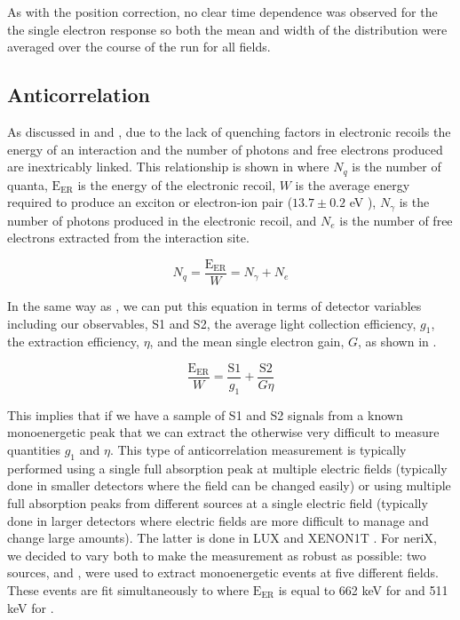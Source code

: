 As with the position correction, no clear time dependence was observed for the the single electron response so both the mean and width of the distribution were averaged over the course of the run for all fields.



\subsection{Anticorrelation}
\label{sec:nerix_anticorrelation}

As discussed in  and , due to the lack of quenching factors in electronic recoils the energy of an interaction and the number of photons and free electrons produced are inextricably linked.  This relationship is shown in  where $N_q$ is the number of quanta, $\textrm{E}_{\textrm{ER}}$ is the energy of the electronic recoil, $W$ is the average energy required to produce an exciton or electron-ion pair ($13.7 \pm 0.2$ eV \cite{dahl_thesis}), $N_{\gamma}$ is the number of photons produced in the electronic recoil, and $N_e$ is the number of free electrons extracted from the interaction site.

\begin{equation}
        \label{eqn:nerix_anticorrelation}
        N_q = \frac{\textrm{E}_{\textrm{ER}}}{W} = N_{\gamma} + N_{e}
\end{equation} 

In the same way as , we can put this equation in terms of detector variables including our observables, S1 and S2, the average light collection efficiency, $g_1$, the extraction efficiency, $\eta$, and the mean single electron gain, $G$, as shown in .

\begin{equation}
        \label{eqn:nerix_anticorrelation_s1_s2}
        \frac{\textrm{E}_{\textrm{ER}}}{W} = \frac{\textrm{S1}}{g_1} + \frac{\textrm{S2}}{G \eta}
\end{equation}

This implies that if we have a sample of S1 and S2 signals from a known monoenergetic peak that we can extract the otherwise very difficult to measure quantities $g_1$ and $\eta$.  This type of anticorrelation measurement is typically performed using a single full absorption peak at multiple electric fields (typically done in smaller detectors where the field can be changed easily) or using multiple full absorption peaks from different sources at a single electric field (typically done in larger detectors where electric fields are more difficult to manage and change large amounts).  The latter is done in LUX \cite{akerib2016improved} and XENON1T \cite{aprile2017first}.  For neriX, we decided to vary both to make the measurement as robust as possible: two sources, \cesium{} and \sodium{}, were used to extract monoenergetic events at five different fields.  These events are fit simultaneously to  where $\textrm{E}_{\textrm{ER}}$ is equal to 662 keV for \cesium{} and 511 keV for \sodium{}.


